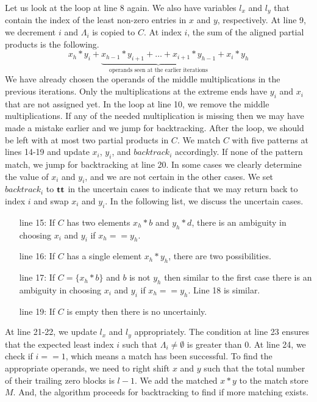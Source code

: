 Let us look at the loop at line 8 again.
%
We also have variables $l_x$ and $l_y$ that contain the index of
the least non-zero entries in $x$ and $y$, respectively.
%
At line 9, we decrement $i$ and $\Lambda_i$ is copied to $C$.
%
At index $i$, the sum of the aligned partial products is the following.
$$
x_{h}*y_{i} + \underbrace{x_{h-1}*y_{i+1} + \dots + x_{i+1}*y_{h-1}}_{\text{operands seen at the earlier iterations}} + x_{i}*y_{h}
$$
We have already chosen the operands of the middle multiplications in
the previous iterations.
%
Only the multiplications at the extreme ends have $y_i$ and $x_i$ that are
not assigned yet.
%
In the loop at line 10, we remove the middle multiplications.
%
If any of the needed multiplication is missing then we may have made a mistake
earlier and we jump for backtracking.
%
After the loop, we should be left with at most two partial products in $C$.
%
We match $C$ with five patterns at lines 14-19 and
update $x_i$, $y_i$, and $backtrack_i$ accordingly.
%
If none of the pattern match, we jump for backtracking at line 20.
%
In some cases we clearly determine the value of $x_i$ and $y_i$, and
we are not certain in the other cases.
%
We set $backtrack_i$ to $\mathbf{tt}$ in the uncertain cases to indicate
that we may return back to index $i$ and swap $x_i$ and $y_i$.
%
In the following list, we discuss the uncertain cases.
%
\begin{itemize}
\item[line 15:] If $C$ has two elements $x_h*b$ and $y_h*d$,
there is an ambiguity in choosing $x_i$ and $y_i$
if $x_h == y_h$.
%
\item[line 16:] If $C$ has a single element $x_h*y_h$, there  
are two possibilities.
\item[line 17:] If $C = \{x_h*b\}$ and $b$ is not $y_h$ then 
  similar to the first case there is an ambiguity in
  choosing $x_i$ and $y_i$ if $x_h == y_h$. Line 18 is similar.
\item[line 19:] If $C$ is empty then there is no uncertainly. %
\end{itemize}
%
At line 21-22, we update $l_x$ and $l_y$ appropriately.
%
The condition at line 23 ensures that the expected
least index $i$ such that $\Lambda_i \neq \emptyset$ is greater than 0.    
%
At line 24, we check if $i==1$, which means a match has been successful.
%
To find the appropriate operands, we need to right shift $x$ and $y$
such that the total number of their trailing zero blocks is $l-1$.
%
We add the matched $x*y$ to the match store $M$.
%
And, the algorithm proceeds for backtracking to find if more matching
exists.

